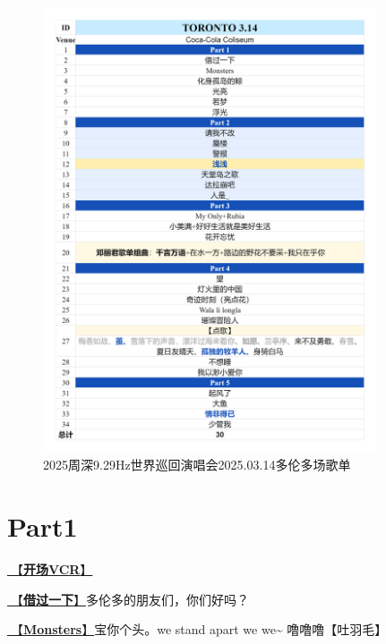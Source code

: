 \documentclass[]{ctexbook}
\begin{document}
\begin{figure}

{\centering \includegraphics[width=280pt]{img/playlists/playlists-toronto-20250314} 

}

\caption{2025周深9.29Hz世界巡回演唱会2025.03.14多伦多场歌单}\label{fig:unnamed-chunk-183}
\end{figure}

\newpage

\section{Part1}\label{Toronto-20250314-part1}

\hyperref[opening-vcr]{🎥【\textbf{开场VCR}】}

\hyperref[I-will-go-my-way]{🎵【\textbf{借过一下}】}多伦多的朋友们，你们好吗？

\hyperref[Monsters]{🎵【\textbf{Monsters}】}宝你个头。we stand apart we we\textasciitilde{} 噜噜噜【吐羽毛】
\end{document}

